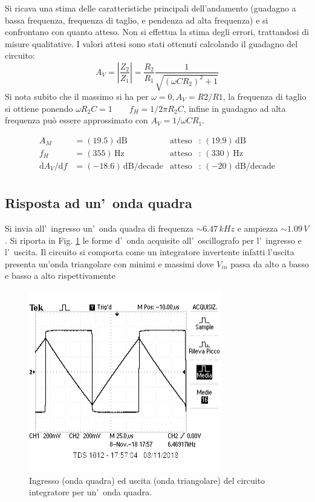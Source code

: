 \documentclass[10pt,a4paper]{article}
\begin{document}
Si ricava una stima delle caratteristiche principali dell'andamento (guadagno a bassa frequenza, frequenza di taglio, e pendenza ad alta frequenza)
e si confrontano con quanto atteso. Non si effettua la stima degli errori, trattandosi di misure qualitative. I valori attesi sono stati ottenuti calcolando il guadagno del circuito:
\begin{equation*}
A_V=|\frac{Z_2}{Z_1}|=\frac{R_2}{R_1}\frac{1}{\sqrt{(\omega C R_2)^2 +1}}
\end{equation*}
Si nota subito che il massimo si ha per $\omega=0, A_V=R2/R1$, la frequenza di taglio si ottiene ponendo $\omega R_2 C=1 \qquad f_H = 1/2\pi R_2 C$, infine in guadagno ad alta frequenza può essere approssimato con $A_V = 1/\omega C R_1$.

\begin{align*}
A_M &= (19.5)\,\mathrm{dB} & \mathrm{atteso} &:\,(19.9  )\, \mathrm{dB}  \\
f_H &= (355)\,\mathrm{Hz} & \mathrm{atteso} &:\,(330  )\, \mathrm{Hz} \\
{\mathrm{d}A_V}/{\mathrm{d}f} &= (-18.6)\,\mathrm{dB/decade} & \mathrm{atteso} &:\,(-20 )\, \mathrm{dB/decade}  \\
\end{align*}


%
\subsection*{Risposta ad un'~onda quadra}
Si invia all'~ingresso un'~onda quadra di frequenza $\sim 6.47\,kHz$ e ampiezza $\sim 1.09\,V$.
Si riporta in Fig. \ref{fig:oscinte} le forme d'~onda acquisite all'~oscillografo per l'~ingresso
e l'~uscita. Il circuito si comporta come un integratore invertente infatti l'uscita presenta un'onda triangolare con minimi e massimi dove $V_{in}$ passa da alto a basso e basso a alto rispettivamente

\begin{figure}[htb]
\begin{center}
\includegraphics[width=0.45\linewidth]{screenshot/foto3.png}
\end{center}
\caption{\small Ingresso (onda quadra) ed uscita (onda triangolare) del circuito integratore per un'~onda quadra.}
\label{fig:oscinte}
\end{figure}
%
\end{document}
